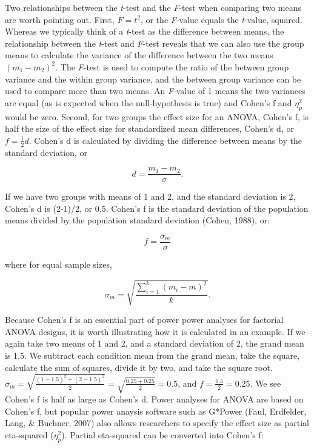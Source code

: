 \documentclass[,man,floatsintext]{apa6}
\begin{document}
Two relationships between the \emph{t}-test and the \emph{F}-test when
comparing two means are worth pointing out. First, \(F = t^2\), or the
\emph{F}-value equals the \emph{t}-value, squared. Whereas we typically
think of a \emph{t}-test as the difference between means, the
relationship between the \emph{t}-test and \emph{F}-test reveals that we
can also use the group means to calculate the variance of the difference
between the two means \((m_1 - m_2)^2\). The \emph{F}-test is used to
compute the ratio of the between group variance and the within group
variance, and the between group variance can be used to compare more
than two means. An \emph{F}-value of 1 means the two variances are equal
(as is expected when the null-hypothesis is true) and Cohen's f and
\(\eta_p^2\) would be zero. Second, for two groups the effect size for
an ANOVA, Cohen's f, is half the size of the effect size for
standardized mean differences, Cohen's d, or \(f = \frac{1}{2}d\).
Cohen's d is calculated by dividing the difference between means by the
standard deviation, or

\begin{equation}
d = \frac{m_1-m_2}{\sigma}.
\end{equation}

If we have two groups with means of 1 and 2, and the standard deviation
is 2, Cohen's d is (2-1)/2, or 0.5. Cohen's f is the standard deviation
of the population means divided by the population standard deviation
(Cohen, 1988), or:

\begin{equation}
f = \frac{\sigma _{ m }}{\sigma}
\end{equation}

where for equal sample sizes,

\begin{equation}
\sigma _{ m } = \sqrt { \frac { \sum_ { i = 1 } ^ { k } ( m _ { i } - m ) ^ { 2 } } { k } }.
\end{equation}

Because Cohen's f is an essential part of power power analyses for
factorial ANOVA designs, it is worth illustrating how it is calculated
in an example. If we again take two means of 1 and 2, and a standard
deviation of 2, the grand mean is 1.5. We subtract each condition mean
from the grand mean, take the square, calculate the sum of squares,
divide it by two, and take the square root.
\(\sigma_m = \sqrt{\frac{(1-1.5)^2+(2-1.5)^2}{2}} = \sqrt{\frac{0.25+0.25}{2}} = 0.5\),
and \(f = \frac{0.5}{2} = 0.25.\) We see Cohen's f is half as large as
Cohen's d. Power analyses for ANOVA are based on Cohen's f, but popular
power anaysis software such as G*Power (Faul, Erdfelder, Lang, \&
Buchner, 2007) also allows researchers to specify the effect size as
partial eta-squared (\(\eta_p^2\)). Partial eta-squared can be converted
into Cohen's f:
\end{document}
